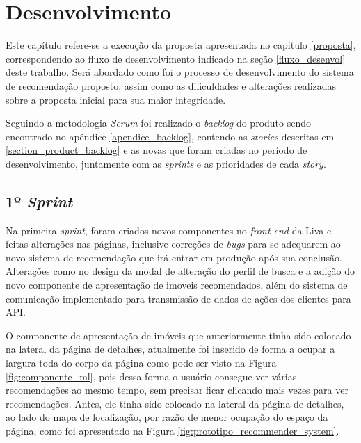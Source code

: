 \chapter{Desenvolvimento}
\label{desenvolvimento}

Este capítulo refere-se a execução da proposta apresentada no capitulo \ref{proposta}, correspondendo ao fluxo de desenvolvimento indicado na seção \ref{fluxo_desenvol} deste trabalho. Será abordado como foi o processo de desenvolvimento do sistema de recomendação proposto, assim como as dificuldades e alterações realizadas sobre a proposta inicial para sua maior integridade.



Seguindo a metodologia \textit{Scrum} foi realizado o \textit{backlog} do produto sendo encontrado no apêndice \ref{apendice_backlog}, contendo as \textit{stories} descritas em \ref{section_product_backlog} e as novas que foram criadas no período de desenvolvimento, juntamente com as \textit{sprints} e as prioridades de cada \textit{story}.


\section{1º \textit{Sprint}}

Na primeira \textit{sprint}, foram criados novos componentes no \textit{front-end} da Liva e feitas alterações nas páginas, inclusive correções de \textit{bugs} para se adequarem ao novo sistema de recomendação que irá entrar em produção após sua conclusão. Alterações como no design da modal de alteração do perfil de busca e a adição do novo componente de apresentação de imoveis recomendados, além do sistema de comunicação implementado para transmissão de dados de ações dos clientes para API.

O componente de apresentação de imóveis que anteriormente tinha sido colocado na lateral da página de detalhes, atualmente foi inserido de forma a ocupar a largura toda do corpo da página como pode ser visto na Figura \ref{fig:componente_ml}, pois dessa forma o usuário consegue ver várias recomendações ao mesmo tempo, sem precisar ficar clicando mais vezes para ver recomendações. Antes, ele tinha sido colocado na lateral da página de detalhes, ao lado do mapa de localização, por razão de menor ocupação do espaço da página, como foi apresentado na Figura \ref{fig:prototipo_recommender_system}.

